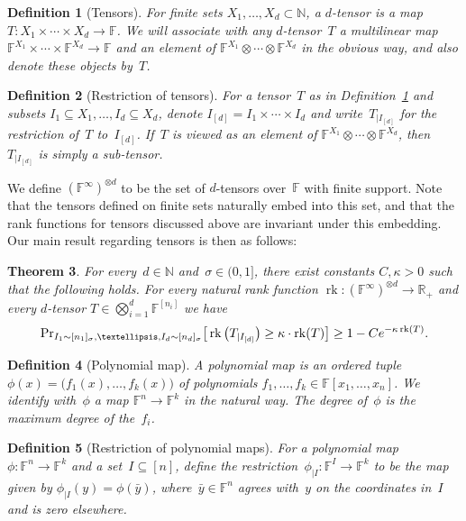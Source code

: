 \documentclass[10pt]{article}
\newtheorem{theorem}{Theorem}[section]
\newtheorem{definition}[theorem]{Definition}
\renewcommand{\Pr}{\mbox{\rm Pr}}
\newcommand{\R}{\mathbb{R}}
\newcommand{\N}{\mathbb{N}}
\newcommand{\F}{\mathbb{F}}
\newcommand{\1}{\mathbf{1}}
\DeclareMathOperator{\rank}{rk}
\newcommand{\beqn}{\begin{equation*}}
\newcommand{\eeqn}{\end{equation*}}
\begin{document}
\begin{definition}[Tensors]\label{def:tensors}
For finite sets $X_1,\dots,X_d \subset \N$, a $d$-tensor is a map $T:X_1\times\cdots\times X_d\to \F$.
We will associate with any $d$-tensor~$T$ a multilinear map $\F^{X_1}\times\cdots\times \F^{X_d}\to \F$ and an element of $\F^{X_1}\otimes \cdots\otimes \F^{X_d}$ in the obvious way, and also denote these objects by~$T$.
\end{definition}

\begin{definition}[Restriction of tensors]
For a tensor~$T$ as in Definition~\ref{def:tensors} and subsets $I_1\subseteq X_1,\dots,I_d\subseteq X_d$, denote $I_{[d]} = I_1\times \cdots\times I_d$ and write~$T_{|I_{[d]}}$ for the restriction of~$T$ to~$I_{[d]}$.
If~$T$ is viewed as an element of $\F^{X_1}\otimes \cdots\otimes \F^{X_d}$, then~$T_{|I_{[d]}}$ is simply a sub-tensor.
\end{definition}

We define $(\F^\infty)^{\otimes d}$ to be the set of $d$-tensors over~$\F$ with finite support.
Note that the tensors defined on finite sets naturally embed into this set, and that the rank functions for tensors discussed above are invariant under this embedding.
Our main result regarding tensors is then as follows:

\begin{theorem}\label{thm:random_tensor}
For every~$d\in \N$ and~$\sigma\in (0,1]$, there exist constants $C, \kappa > 0$ such that the following holds.
For every natural rank function $\rank: (\F^{\infty})^{\otimes d} \to \R_+$ and every $d$-tensor $T \in \bigotimes_{i=1}^d \F^{[n_i]}$ we have
\beqn
\Pr_{I_1\sim [n_1]_{\sigma}, \dots, I_d\sim [n_d]_{\sigma}}\big[ \rank \big(T_{|I_{[d]}}\big) \geq \kappa\cdot \rank(T)\big] \geq 1 - C e^{-\kappa \rank(T)}.
\eeqn
\end{theorem}
\setcounter{theorem}{5}
\begin{definition}[Polynomial map]\label{def:polymap}
A polynomial map is an ordered tuple $\phi(x) = \big(f_1(x),\dots,f_k(x)\big)$ of polynomials $f_1,\dots,f_k\in \F[x_1,\dots,x_n]$.
We identify with~$\phi$ a map $\F^n\to\F^k$ in the natural way.
The degree of~$\phi$ is the maximum degree of the~$f_i$.
\end{definition}

\begin{definition}[Restriction of polynomial maps]
For a polynomial map~$\phi:\F^n\to\F^k$ and a set~$I\subseteq [n]$, define the restriction~$\phi_{|I}:\F^I\to\F^k$ to be the map given by
$\phi_{|I}(y) = \phi(\bar y)$,
where~$\bar y\in \F^n$ agrees with~$y$ on the coordinates in~$I$ and is zero elsewhere.
\end{definition}
\end{document}
